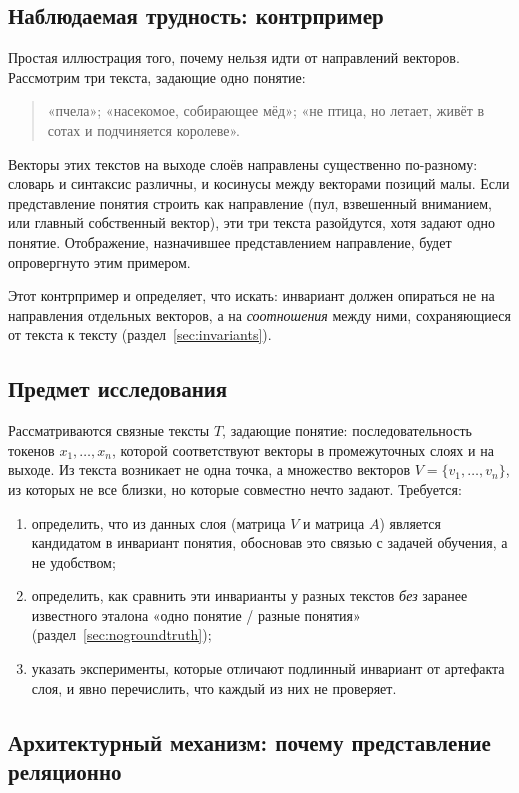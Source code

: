\documentclass[11pt,a4paper]{article}
\theoremstyle{definition}
\theoremstyle{plain}
\begin{document}
\subsection{Наблюдаемая трудность: контрпример}

Простая иллюстрация того, почему нельзя идти от направлений векторов. Рассмотрим три текста,
задающие одно понятие:
\begin{quote}
«пчела»; \quad «насекомое, собирающее мёд»; \quad «не птица, но летает, живёт в сотах и
подчиняется королеве».
\end{quote}
Векторы этих текстов на выходе слоёв направлены существенно по-разному: словарь и синтаксис
различны, и косинусы между векторами позиций малы. Если представление понятия строить как
направление (пул, взвешенный вниманием, или главный собственный вектор), эти три текста
разойдутся, хотя задают одно понятие. Отображение, назначившее представлением направление,
будет опровергнуто этим примером.

Этот контрпример и определяет, что искать: инвариант должен опираться не на направления
отдельных векторов, а на \emph{соотношения} между ними, сохраняющиеся от текста к тексту
(раздел~\ref{sec:invariants}).

\subsection{Предмет исследования}

Рассматриваются связные тексты $T$, задающие понятие: последовательность токенов
$x_1,\dots,x_n$, которой соответствуют векторы в промежуточных слоях и на выходе. Из текста
возникает не одна точка, а множество векторов $V=\{v_1,\dots,v_n\}$, из которых не все близки,
но которые совместно нечто задают. Требуется:
\begin{enumerate}[label=(\arabic*)]
\item определить, что из данных слоя (матрица $V$ и матрица $A$) является кандидатом в
инвариант понятия, обосновав это связью с задачей обучения, а не удобством;
\item определить, как сравнить эти инварианты у разных текстов \emph{без} заранее известного
эталона «одно понятие / разные понятия» (раздел~\ref{sec:nogroundtruth});
\item указать эксперименты, которые отличают подлинный инвариант от артефакта слоя, и явно
перечислить, что каждый из них не проверяет.
\end{enumerate}

\subsection{Архитектурный механизм: почему представление реляционно}\label{sec:mechanism}
\end{document}
